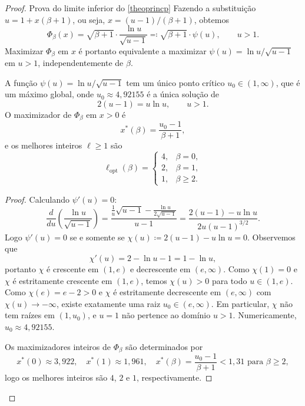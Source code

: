\documentclass[reqno,a4paper,12pt]{amsart}
\begin{document}
\begin{proof}{Prova do limite inferior do \ref{theoprincp}}
  Fazendo a substituição $u = 1 + x(\beta+1)$, ou seja, $x = (u-1)/(\beta+1)$, obtemos
  \[
    \Phi_\beta(x)
    = \sqrt{\beta+1} \cdot \frac{\ln u}{\sqrt{u-1}}
    \eqqcolon \sqrt{\beta+1} \cdot \psi(u),
    \qquad u > 1.
  \]
  Maximizar $\Phi_\beta$ em $x$ é portanto equivalente a maximizar $\psi(u) = \ln u / \sqrt{u-1}$ em $u > 1$,
  independentemente de $\beta$.

  \begin{lemma}\label{lem:opt-ell}
    A função $\psi(u) = \ln u / \sqrt{u-1}$ tem um único ponto crítico $u_0 \in (1,\infty)$,
    que é um máximo global, onde $u_0 \approx 4{,}92155$ é a única solução de
    \[
      2(u-1) = u \ln u, \qquad u > 1.
    \]
    O maximizador de $\Phi_\beta$ em $x > 0$ é
    \[
      x^*(\beta) = \frac{u_0 - 1}{\beta+1},
    \]
    e os melhores inteiros $\ell \geq 1$ são
    \[
      \ell_{\mathrm{opt}}(\beta)
      = \begin{cases}
        4, & \beta = 0,    \\
        2, & \beta = 1,    \\
        1, & \beta \geq 2.
      \end{cases}
    \]
  \end{lemma}

  \begin{proof}
    Calculando $\psi'(u) = 0$:
    \[
      \frac{d}{du}\left(\frac{\ln u}{\sqrt{u-1}}\right)
      = \frac{\frac{1}{u}\sqrt{u-1} - \frac{\ln u}{2\sqrt{u-1}}}{u-1}
      = \frac{2(u-1) - u\ln u}{2u(u-1)^{3/2}}.
    \]
    Logo $\psi'(u) = 0$ se e somente se $\chi(u) \coloneqq 2(u-1) - u\ln u = 0$.
    Observemos que
    \[
      \chi'(u) = 2 - \ln u - 1 = 1 - \ln u,
    \]
    portanto $\chi$ é crescente em $(1,e)$ e decrescente em $(e,\infty)$.
    Como $\chi(1) = 0$ e $\chi$ é estritamente crescente em $(1,e)$,
    temos $\chi(u) > 0$ para todo $u \in (1,e)$.
    Como $\chi(e) = e - 2 > 0$ e $\chi$ é estritamente decrescente em $(e,\infty)$
    com $\chi(u) \to -\infty$, existe exatamente uma raiz $u_0 \in (e,\infty)$.
    Em particular, $\chi$ não tem raízes em $(1, u_0)$, e $u = 1$ não pertence
    ao domínio $u > 1$. Numericamente, $u_0 \approx 4{,}92155$.

    Os maximizadores inteiros de $\Phi_\beta$ são determinados por
    \[
      x^*(0) \approx 3{,}922, \quad
      x^*(1) \approx 1{,}961, \quad
      x^*(\beta) = \frac{u_0-1}{\beta+1} < 1{,}31 \text{ para } \beta \geq 2,
    \]
    logo os melhores inteiros são $4$, $2$ e $1$, respectivamente.
  \end{proof}


\end{proof}
\end{document}
